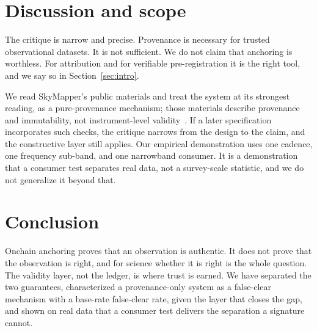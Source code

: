 \documentclass[conference]{IEEEtran}
\begin{document}
\section{Discussion and scope}\label{sec:scope}
The critique is narrow and precise. Provenance is necessary for trusted
observational datasets. It is not sufficient. We do not claim that anchoring is
worthless. For attribution and for verifiable pre-registration it is the right
tool, and we say so in Section~\ref{sec:intro}.

We read SkyMapper's public materials and treat the system at its strongest
reading, as a pure-provenance mechanism; those materials describe provenance and
immutability, not instrument-level validity~\cite{skymapper}. If a later
specification incorporates such checks, the critique narrows from the design to
the claim, and the constructive layer still applies. Our empirical demonstration uses one cadence, one frequency
sub-band, and one narrowband consumer. It is a demonstration that a consumer test
separates real data, not a survey-scale statistic, and we do not generalize it
beyond that.

\section{Conclusion}\label{sec:conclusion}
Onchain anchoring proves that an observation is authentic. It does not prove that
the observation is right, and for science whether it is right is the whole
question. The validity layer, not the ledger, is where trust is earned. We have
separated the two guarantees, characterized a provenance-only system as a
false-clear mechanism with a base-rate false-clear rate, given the layer that
closes the gap, and shown on real data that a consumer test delivers the
separation a signature cannot.



\end{document}
